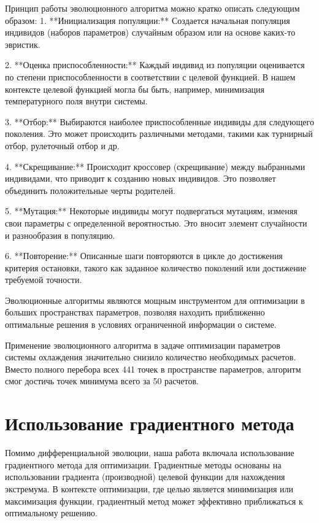 \documentclass[a4paper,12pt]{article}
\theoremstyle{plain} %
\theoremstyle{definition} %
\theoremstyle{remark} %
\begin{document}
Принцип работы эволюционного алгоритма можно кратко описать следующим образом:
1. **Инициализация популяции:** Создается начальная популяция индивидов (наборов параметров) случайным образом или на основе каких-то эвристик.

2. **Оценка приспособленности:** Каждый индивид из популяции оценивается по степени приспособленности в соответствии с целевой функцией. В нашем контексте целевой функцией могла бы быть, например, минимизация температурного поля внутри системы.

3. **Отбор:** Выбираются наиболее приспособленные индивиды для следующего поколения. Это может происходить различными методами, такими как турнирный отбор, рулеточный отбор и др.

4. **Скрещивание:** Происходит кроссовер (скрещивание) между выбранными индивидами, что приводит к созданию новых индивидов. Это позволяет объединить положительные черты родителей.

5. **Мутация:** Некоторые индивиды могут подвергаться мутациям, изменяя свои параметры с определенной вероятностью. Это вносит элемент случайности и разнообразия в популяцию.

6. **Повторение:** Описанные шаги повторяются в цикле до достижения критерия остановки, такого как заданное количество поколений или достижение требуемой точности.

Эволюционные алгоритмы являются мощным инструментом для оптимизации в больших пространствах параметров, позволяя находить приближенно оптимальные решения в условиях ограниченной информации о системе.

Применение эволюционного алгоритма в задаче оптимизации параметров системы охлаждения значительно снизило количество необходимых расчетов. Вместо полного перебора всех 441 точек в пространстве параметров, алгоритм смог достичь точек минимума всего за 50 расчетов.

\section{Использование градиентного метода}

Помимо дифференциальной эволюции, наша работа включала использование градиентного метода для оптимизации. Градиентные методы основаны на использовании градиента (производной) целевой функции для нахождения экстремума. В контексте оптимизации, где целью является минимизация или максимизация функции, градиентный метод может эффективно приближаться к оптимальному решению.
\end{document}
